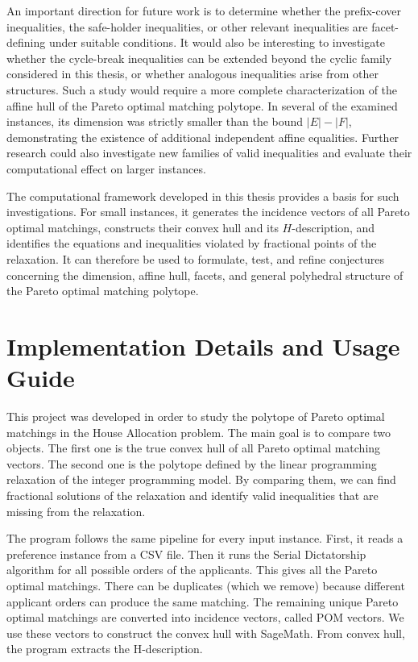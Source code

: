 \documentclass[12pt]{report}
\numberwithin{algorithm}{chapter}
\begin{document}
	An important direction for future work is to determine whether the prefix-cover inequalities, the safe-holder inequalities, or other relevant inequalities are facet-defining under suitable conditions. It would also be interesting to investigate whether the cycle-break inequalities can be extended beyond the cyclic family considered in this thesis, or whether analogous inequalities arise from other structures. Such a study would require a more complete characterization of the affine hull of the Pareto optimal matching polytope. In several of the examined instances, its dimension was strictly
	smaller than the bound $|E|-|F|$, demonstrating the existence of additional
	independent affine equalities. Further research could also investigate new
	families of valid inequalities and evaluate their computational effect on larger instances.
	
	The computational framework developed in this thesis provides a basis for such
	investigations. For small instances, it generates the incidence vectors of all
	Pareto optimal matchings, constructs their convex hull and its
	$H$-description, and identifies the equations and inequalities violated by
	fractional points of the relaxation. It can therefore be used to formulate,
	test, and refine conjectures concerning the dimension, affine hull, facets, and general polyhedral structure of the Pareto optimal matching polytope.

\appendix

\chapter{Implementation Details and Usage Guide}

	This project was developed in order to study the polytope of Pareto optimal matchings in the House Allocation problem. The main goal is to compare two objects. The first one is the true convex hull of all Pareto optimal matching vectors. The second one is the polytope defined by the linear programming relaxation of the integer programming model. By comparing them, we can find fractional solutions of the relaxation and identify valid inequalities that are missing from the relaxation.

	The program follows the same pipeline for every input instance. First, it reads a preference instance from a CSV file. Then it runs the Serial Dictatorship algorithm for all possible orders of the applicants. This gives all the Pareto optimal matchings. There can be duplicates (which we remove) because different applicant orders can produce the same matching. The remaining unique Pareto optimal matchings are converted into incidence vectors, called POM vectors. We use these vectors to construct the convex hull with SageMath. From convex hull, the program extracts the H-description.
\end{document}
